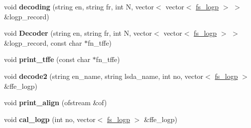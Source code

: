 \begin{DoxyCompactItemize}
\item 
\hypertarget{classRankModel_a66b74afeef192c38beae134fda20869c}{void {\bfseries decoding} (string en, string fr, int \-N, vector$<$ vector$<$ \hyperlink{classfs__logp}{fs\-\_\-logp} $>$ $>$ \&logp\-\_\-record)}\label{classRankModel_a66b74afeef192c38beae134fda20869c}

\item 
\hypertarget{classRankModel_a3a69fe40ea1be385fa43325ea1b9fad2}{void {\bfseries \-Decoder} (string en, string fr, int \-N, vector$<$ vector$<$ \hyperlink{classfs__logp}{fs\-\_\-logp} $>$ $>$ \&logp\-\_\-record, const char $\ast$fn\-\_\-tffe)}\label{classRankModel_a3a69fe40ea1be385fa43325ea1b9fad2}

\item 
\hypertarget{classRankModel_acba77eb9ab31a0750960d4a38c12b469}{void {\bfseries print\-\_\-tffe} (const char $\ast$fn\-\_\-tffe)}\label{classRankModel_acba77eb9ab31a0750960d4a38c12b469}

\item 
\hypertarget{classRankModel_a1918deff8d9d9b2ef130b504f21dbb96}{void {\bfseries decode2} (string en\-\_\-name, string lsda\-\_\-name, int no, vector$<$ \hyperlink{classfs__logp}{fs\-\_\-logp} $>$ \&ffe\-\_\-logp)}\label{classRankModel_a1918deff8d9d9b2ef130b504f21dbb96}

\item 
\hypertarget{classRankModel_ad6d65a12a4d000c8cc3c1301ab87a055}{void {\bfseries print\-\_\-align} (ofstream \&of)}\label{classRankModel_ad6d65a12a4d000c8cc3c1301ab87a055}

\item 
\hypertarget{classRankModel_a7789082abe6ede8944b76f695a62e237}{void {\bfseries cal\-\_\-logp} (int no, vector$<$ \hyperlink{classfs__logp}{fs\-\_\-logp} $>$ \&ffe\-\_\-logp)}\label{classRankModel_a7789082abe6ede8944b76f695a62e237}

\end{DoxyCompactItemize}
